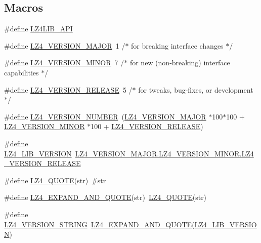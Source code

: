 \subsection*{Macros}
\begin{DoxyCompactItemize}
\item 
\#define \hyperlink{compat-lz4_8h_a00a61e1435005f8a621edf4bbe0ef844}{L\+Z4\+L\+I\+B\+\_\+\+A\+P\+I}
\item 
\#define \hyperlink{compat-lz4_8h_a4a15eb1f8aa69834f917a50d7652413e}{L\+Z4\+\_\+\+V\+E\+R\+S\+I\+O\+N\+\_\+\+M\+A\+J\+O\+R}~1    /$\ast$ for breaking interface changes  $\ast$/
\item 
\#define \hyperlink{compat-lz4_8h_af16952f74f68ac445da9fc7603609909}{L\+Z4\+\_\+\+V\+E\+R\+S\+I\+O\+N\+\_\+\+M\+I\+N\+O\+R}~7    /$\ast$ for new (non-\/breaking) interface capabilities $\ast$/
\item 
\#define \hyperlink{compat-lz4_8h_a19d496bbe4d8448bc2d42cfb576cf525}{L\+Z4\+\_\+\+V\+E\+R\+S\+I\+O\+N\+\_\+\+R\+E\+L\+E\+A\+S\+E}~5    /$\ast$ for tweaks, bug-\/fixes, or development $\ast$/
\item 
\#define \hyperlink{compat-lz4_8h_aac7e910a11c45364a8b235d0d43a0265}{L\+Z4\+\_\+\+V\+E\+R\+S\+I\+O\+N\+\_\+\+N\+U\+M\+B\+E\+R}~(\hyperlink{compat-lz4_8h_a4a15eb1f8aa69834f917a50d7652413e}{L\+Z4\+\_\+\+V\+E\+R\+S\+I\+O\+N\+\_\+\+M\+A\+J\+O\+R} $\ast$100$\ast$100 + \hyperlink{compat-lz4_8h_af16952f74f68ac445da9fc7603609909}{L\+Z4\+\_\+\+V\+E\+R\+S\+I\+O\+N\+\_\+\+M\+I\+N\+O\+R} $\ast$100 + \hyperlink{compat-lz4_8h_a19d496bbe4d8448bc2d42cfb576cf525}{L\+Z4\+\_\+\+V\+E\+R\+S\+I\+O\+N\+\_\+\+R\+E\+L\+E\+A\+S\+E})
\item 
\#define \hyperlink{compat-lz4_8h_acefd86d684fc67bca4c3d5a0e9675268}{L\+Z4\+\_\+\+L\+I\+B\+\_\+\+V\+E\+R\+S\+I\+O\+N}~\hyperlink{compat-lz4_8h_a19d496bbe4d8448bc2d42cfb576cf525}{L\+Z4\+\_\+\+V\+E\+R\+S\+I\+O\+N\+\_\+\+M\+A\+J\+O\+R.\+L\+Z4\+\_\+\+V\+E\+R\+S\+I\+O\+N\+\_\+\+M\+I\+N\+O\+R.\+L\+Z4\+\_\+\+V\+E\+R\+S\+I\+O\+N\+\_\+\+R\+E\+L\+E\+A\+S\+E}
\item 
\#define \hyperlink{compat-lz4_8h_a094a758915b2bd38b0012856a45bbc10}{L\+Z4\+\_\+\+Q\+U\+O\+T\+E}(str)~\#str
\item 
\#define \hyperlink{compat-lz4_8h_a988eddb5b68034df6d10b3f229315606}{L\+Z4\+\_\+\+E\+X\+P\+A\+N\+D\+\_\+\+A\+N\+D\+\_\+\+Q\+U\+O\+T\+E}(str)~\hyperlink{compat-lz4_8h_a094a758915b2bd38b0012856a45bbc10}{L\+Z4\+\_\+\+Q\+U\+O\+T\+E}(str)
\item 
\#define \hyperlink{compat-lz4_8h_a2eab5fe1369fa5559f6ad37898ed5e1b}{L\+Z4\+\_\+\+V\+E\+R\+S\+I\+O\+N\+\_\+\+S\+T\+R\+I\+N\+G}~\hyperlink{compat-lz4_8h_a988eddb5b68034df6d10b3f229315606}{L\+Z4\+\_\+\+E\+X\+P\+A\+N\+D\+\_\+\+A\+N\+D\+\_\+\+Q\+U\+O\+T\+E}(\hyperlink{compat-lz4_8h_acefd86d684fc67bca4c3d5a0e9675268}{L\+Z4\+\_\+\+L\+I\+B\+\_\+\+V\+E\+R\+S\+I\+O\+N})

\end{DoxyCompactItemize}
